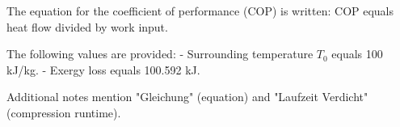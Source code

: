 The equation for the coefficient of performance (COP) is written:  
COP equals heat flow divided by work input.  

The following values are provided:  
- Surrounding temperature \( T_0 \) equals 100 kJ/kg.  
- Exergy loss equals 100.592 kJ.  

Additional notes mention "Gleichung" (equation) and "Laufzeit Verdicht" (compression runtime).